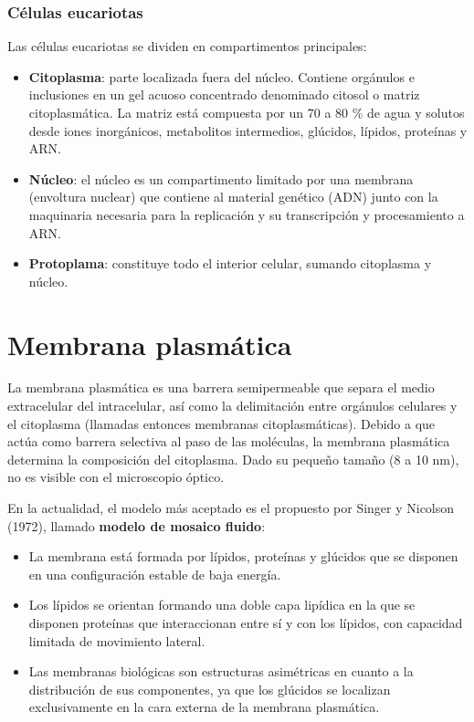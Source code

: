\subsection{Células eucariotas}
Las células eucariotas se dividen en compartimentos principales:
\begin{itemize}[itemsep=0pt,parsep=0pt,topsep=0pt,partopsep=0pt]
    \item \textbf{Citoplasma}: parte localizada fuera del núcleo. Contiene orgánulos e inclusiones en un gel acuoso concentrado denominado citosol o matriz citoplasmática. La matriz está compuesta por un 70 a 80 \% de agua y solutos desde iones inorgánicos, metabolitos intermedios, glúcidos, lípidos, proteínas y ARN.
    \item \textbf{Núcleo}: el núcleo es un compartimento limitado por una membrana (envoltura nuclear) que contiene al material genético (ADN) junto con la maquinaria necesaria para la replicación y su transcripción y procesamiento a ARN.
    \item\textbf{Protoplama}: constituye todo el interior celular, sumando citoplasma y núcleo.
\end{itemize}
\chapter{Membrana plasmática}
La membrana plasmática es una barrera semipermeable que separa el medio extracelular del intracelular, así como la delimitación entre orgánulos celulares y el citoplasma (llamadas entonces membranas citoplasmáticas). Debido a que actúa como barrera selectiva al paso de las moléculas, la membrana plasmática determina la composición del citoplasma. Dado su pequeño tamaño (8 a 10 nm), no es visible con el microscopio óptico.

En la actualidad, el modelo más aceptado es el propuesto por Singer y Nicolson (1972), llamado \textbf{modelo de mosaico fluido}:
\begin{itemize}[itemsep=0pt,parsep=0pt,topsep=0pt,partopsep=0pt]
    \item La membrana está formada por lípidos, proteínas y glúcidos que se disponen en una configuración estable de baja energía.
    \item Los lípidos se orientan formando una doble capa lipídica en la que se disponen proteínas que interaccionan entre sí y con los lípidos, con capacidad limitada de movimiento lateral.
    \item Las membranas biológicas son estructuras asimétricas en cuanto a la distribución de sus componentes, ya que los glúcidos se localizan exclusivamente en la cara externa de la membrana plasmática.
\end{itemize}

